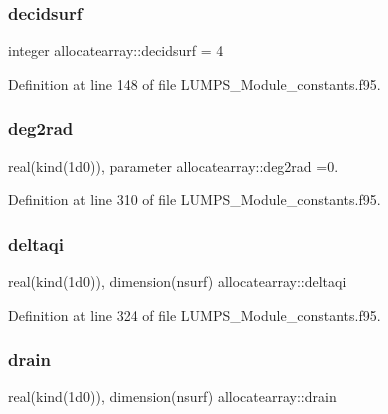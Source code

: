 \subsubsection{\texorpdfstring{decidsurf}{decidsurf}}
{\footnotesize\ttfamily integer allocatearray\+::decidsurf = 4}



Definition at line 148 of file L\+U\+M\+P\+S\+\_\+\+Module\+\_\+constants.\+f95.

\mbox{\label{namespaceallocatearray_a2e733560c2b2c287dce276bfb7eb32db}} 
\subsubsection{\texorpdfstring{deg2rad}{deg2rad}}
{\footnotesize\ttfamily real(kind(1d0)), parameter allocatearray\+::deg2rad =0.}



Definition at line 310 of file L\+U\+M\+P\+S\+\_\+\+Module\+\_\+constants.\+f95.

\mbox{\label{namespaceallocatearray_aca62321fa80aef03d41d2ed66f3ade3a}} 
\subsubsection{\texorpdfstring{deltaqi}{deltaqi}}
{\footnotesize\ttfamily real(kind(1d0)), dimension(nsurf) allocatearray\+::deltaqi}



Definition at line 324 of file L\+U\+M\+P\+S\+\_\+\+Module\+\_\+constants.\+f95.

\mbox{\label{namespaceallocatearray_aeaa22bcbc221cc3e0ca82aa0ac739fd3}} 
\subsubsection{\texorpdfstring{drain}{drain}}
{\footnotesize\ttfamily real(kind(1d0)), dimension(nsurf) allocatearray\+::drain}



